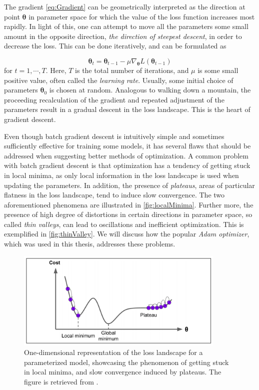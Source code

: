 The gradient \autoref{eq:Gradient} can be geometrically interpreted as the direction at point $\boldsymbol{\theta}$ in parameter space for which the value of the loss function increases most rapidly. In light of this, one can attempt to move all the parameters some small amount in the opposite direction, \emph{the direction of steepest descent}, in order to decrease the loss. This can be done iteratively, and can be formulated as 


\begin{equation}\label{eq:ParameterUpdate}
    \boldsymbol{\theta}_{t} = \boldsymbol{\theta}_{t-1} - \mu \nabla_{\boldsymbol{\theta}} L(\boldsymbol{\theta}_{t-1})
\end{equation}
for $t=1, \cdots, T$. Here, $T$ is the total number of iterations, and $\mu$ is some small positive value, often called the \emph{learning rate}. Usually, some initial choice of parameters $\boldsymbol{\theta}_{0}$ is chosen at random. Analogous to walking down a mountain, the proceeding recalculation of the gradient and repeated adjustment of the parameters result in a gradual descent in the loss landscape. This is the heart of gradient descent.

Even though batch gradient descent is intuitively simple and sometimes sufficiently effective for training some models, it has several flaws that should be addressed when suggesting better methods of optimization. A common problem with batch gradient descent is that optimization has a tendency of getting stuck in local minima, as only local information in the loss landscape is used when updating the parameters. In addition, the presence of \emph{plateaus}, areas of particular flatness in the loss landscape, tend to induce slow convergence. The two aforementioned phenomena are illustrated in \autoref{fig:localMinima}. Further more, the presence of high degree of distortions in certain directions in parameter space, so called  \emph{thin valleys}, can lead to oscillations and inefficient optimization. This is exemplified in \autoref{fig:thinValley}. We will discuss how the popular \emph{Adam optimizer}, which was used in this thesis, addresses these problems. 


\begin{figure}[htp]
    \centering
    \includegraphics[width=10cm]{latex/figures/local_minimum_saddle_point.png}
    \caption{One-dimensional representation of the loss landscape for a parameterized model, showcasing the phenomenon of getting stuck in local minima, and slow convergence induced by plateaus. The figure is retrieved from \citet{hands-on}.}
    \label{fig:localMinima}
\end{figure}

